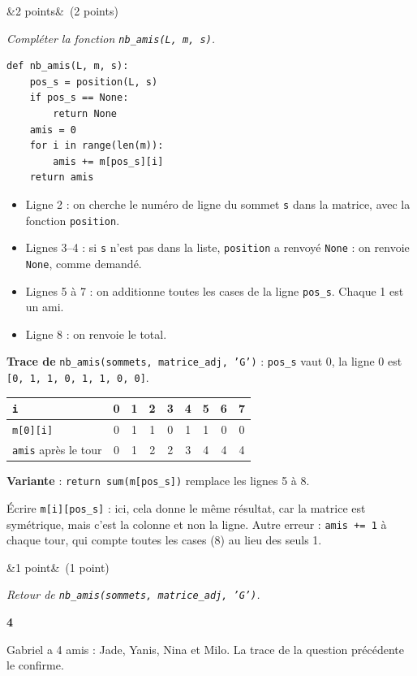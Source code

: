 \documentclass[11pt, a4paper]{exam}
\newcommand{\code}[1]{\texttt{#1}}
\newcommand{\Q}[3]{\par\needspace{5\baselineskip}\bigskip\noindent{\large\bfseries Question #1}\ifx&#2&\else\ \textnormal{(#2)}\fi\par\nopagebreak\smallskip\noindent\textit{#3}\par\nopagebreak\smallskip}
\begin{document}
\Q{2 (c)}{2 points}{Compléter la fonction \code{nb\_amis(L, m, s)}.}
\begin{reponse}
\begin{lstlisting}
def nb_amis(L, m, s):
    pos_s = position(L, s)
    if pos_s == None:
        return None
    amis = 0
    for i in range(len(m)):
        amis += m[pos_s][i]
    return amis
\end{lstlisting}
\end{reponse}
\begin{itemize}
\item Ligne 2 : on cherche le numéro de ligne du sommet \code{s} dans la matrice, avec la fonction \code{position}.
\item Lignes 3--4 : si \code{s} n'est pas dans la liste, \code{position} a renvoyé \code{None} : on renvoie \code{None}, comme demandé.
\item Lignes 5 à 7 : on additionne toutes les cases de la ligne \code{pos\_s}. Chaque 1 est un ami.
\item Ligne 8 : on renvoie le total.
\end{itemize}
\textbf{Trace de} \code{nb\_amis(sommets, matrice\_adj, 'G')} : \code{pos\_s} vaut 0, la ligne 0 est \code{[0, 1, 1, 0, 1, 1, 0, 0]}.
\begin{center}
\renewcommand{\arraystretch}{1.15}
\begin{tabular}{|l|c|c|c|c|c|c|c|c|}
\hline
\code{i} & 0 & 1 & 2 & 3 & 4 & 5 & 6 & 7 \\ \hline
\code{m[0][i]} & 0 & 1 & 1 & 0 & 1 & 1 & 0 & 0 \\ \hline
\code{amis} après le tour & 0 & 1 & 2 & 2 & 3 & 4 & 4 & 4 \\ \hline
\end{tabular}
\end{center}
\textbf{Variante} : \code{return sum(m[pos\_s])} remplace les lignes 5 à 8.
\begin{erreur}
Écrire \code{m[i][pos\_s]} : ici, cela donne le même résultat, car la matrice est symétrique, mais c'est la colonne et non la ligne. Autre erreur : \code{amis += 1} à chaque tour, qui compte toutes les cases (8) au lieu des seuls 1.
\end{erreur}

\Q{2 (d)}{1 point}{Retour de \code{nb\_amis(sommets, matrice\_adj, 'G')}.}
\begin{reponse}
\textbf{4}
\end{reponse}
Gabriel a 4 amis : Jade, Yanis, Nina et Milo. La trace de la question précédente le confirme.
\end{document}

